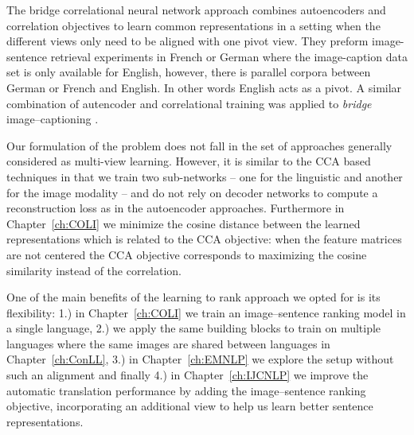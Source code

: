 The bridge correlational neural network approach \citep{rajendran2015bridge}
combines autoencoders and correlation objectives to
learn common representations in a setting when the different views only need to be
aligned with one pivot view. They preform
image-sentence retrieval experiments in French or German where
the image-caption data set is only available for English, however,
there is parallel corpora between German or French and English. In other words English acts as a pivot.
A similar combination of autencoder and correlational training was applied to \emph{bridge}
image--captioning \citep{saha2016correlational}.

Our formulation of the problem does not fall in the set of approaches generally
considered as multi-view learning.  However, it is similar to the CCA based techniques in that we
train two sub-networks -- one for the linguistic and another for the image modality --
and do not rely on decoder networks to compute a reconstruction  loss as in the autoencoder approaches.
Furthermore in Chapter~\ref{ch:COLI} we minimize the cosine distance between the learned representations
which is related to the CCA objective: when the feature matrices are not centered
the CCA objective corresponds to maximizing the cosine similarity instead of the correlation.

One of the main benefits of the learning to rank approach we opted for is
its flexibility: 1.) in Chapter~\ref{ch:COLI} we train an image--sentence ranking model in a single
language, 2.) we apply the same building blocks to train on multiple languages where
the same images are shared between languages in Chapter~\ref{ch:ConLL}, 3.) in
Chapter~\ref{ch:EMNLP} we explore the setup without such an alignment and finally 4.)
in Chapter~\ref{ch:IJCNLP} we improve the automatic translation  performance
by adding the image--sentence ranking objective, incorporating an additional view
to help us learn better sentence representations.

